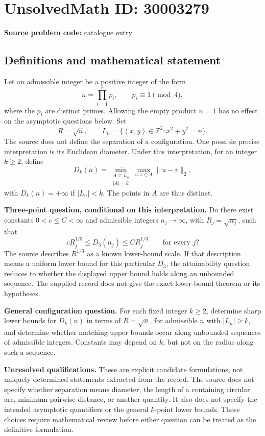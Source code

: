 \documentclass[11pt]{article}
\newcommand{\Z}{\mathbb{Z}}
\begin{document}
\section*{UnsolvedMath ID: 30003279}
\textbf{Source problem code:} catalogue entry
\subsection{Definitions and mathematical statement}
Let an admissible integer be a positive integer of the form
\[
 n=\prod_{i=1}^{r}p_i,
 \qquad p_i\equiv1\pmod4,
\]
where the \(p_i\) are distinct primes. Allowing the empty product \(n=1\) has no effect on the asymptotic questions below. Set
\[
 R=\sqrt n,
 \qquad L_n=\{(x,y)\in\Z^2:x^2+y^2=n\}.
\]
The source does not define the separation of a configuration. One possible precise interpretation is its Euclidean diameter. Under this interpretation, for an integer \(k\ge2\), define
\[
 D_k(n)=\min_{\substack{A\subseteq L_n\\|A|=k}}
 \max_{u,v\in A}\|u-v\|_2,
\]
with \(D_k(n)=+\infty\) if \(|L_n|<k\). The points in \(A\) are thus distinct.

\textbf{Three-point question, conditional on this interpretation.}
Do there exist constants \(0<c\le C<\infty\) and admissible integers \(n_j\to\infty\), with \(R_j=\sqrt{n_j}\), such that
\[
 cR_j^{1/3}\le D_3(n_j)\le CR_j^{1/3}
 \qquad\text{for every }j?
\]
The source describes \(R^{1/3}\) as a known lower-bound scale. If that description means a uniform lower bound for this particular \(D_3\), the attainability question reduces to whether the displayed upper bound holds along an unbounded sequence. The supplied record does not give the exact lower-bound theorem or its hypotheses.

\textbf{General configuration question.}
For each fixed integer \(k\ge2\), determine sharp lower bounds for \(D_k(n)\) in terms of \(R=\sqrt n\), for admissible \(n\) with \(|L_n|\ge k\), and determine whether matching upper bounds occur along unbounded sequences of admissible integers. Constants may depend on \(k\), but not on the radius along such a sequence.

\textbf{Unresolved qualifications.}
These are explicit candidate formulations, not uniquely determined statements extracted from the record. The source does not specify whether separation means diameter, the length of a containing circular arc, minimum pairwise distance, or another quantity. It also does not specify the intended asymptotic quantifiers or the general \(k\)-point lower bounds. Those choices require mathematical review before either question can be treated as the definitive formulation.
\end{document}
